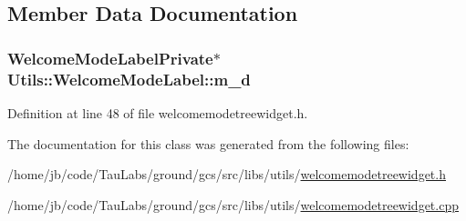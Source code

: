 \subsection{\-Member \-Data \-Documentation}
\hypertarget{class_utils_1_1_welcome_mode_label_a1d69ec538fa784b0c5524d325a11f9a5}{
\subsubsection[{m\-\_\-d}]{\setlength{\rightskip}{0pt plus 5cm}\-Welcome\-Mode\-Label\-Private$\ast$ {\bf \-Utils\-::\-Welcome\-Mode\-Label\-::m\-\_\-d}}}\label{class_utils_1_1_welcome_mode_label_a1d69ec538fa784b0c5524d325a11f9a5}


\-Definition at line 48 of file welcomemodetreewidget.\-h.



\-The documentation for this class was generated from the following files\-:\begin{DoxyCompactItemize}
\item 
/home/jb/code/\-Tau\-Labs/ground/gcs/src/libs/utils/\hyperlink{welcomemodetreewidget_8h}{welcomemodetreewidget.\-h}\item 
/home/jb/code/\-Tau\-Labs/ground/gcs/src/libs/utils/\hyperlink{welcomemodetreewidget_8cpp}{welcomemodetreewidget.\-cpp}\end{DoxyCompactItemize}
